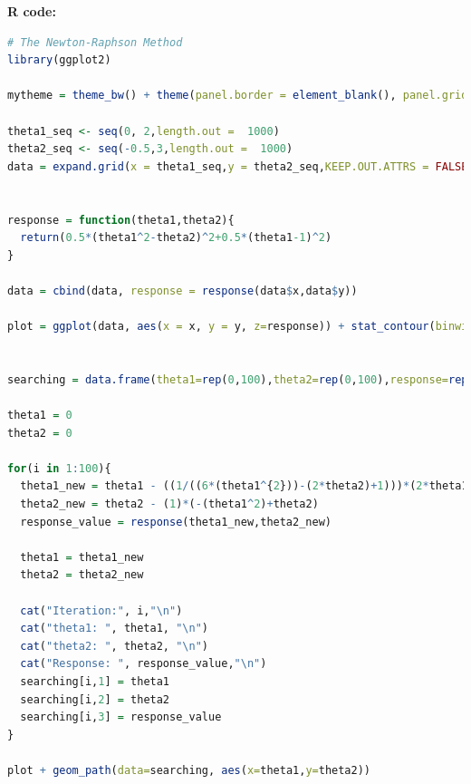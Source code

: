 \documentclass[12pt,a4paper]{article}%
\theoremstyle{definition}
\theoremstyle{plain}
\numberwithin{equation}{section}
\begin{document}
\textbf{R code:}
\tiny
\begin{lstlisting}[language=R]
# The Newton-Raphson Method
library(ggplot2)

mytheme = theme_bw() + theme(panel.border = element_blank(), panel.grid.major = element_blank())

theta1_seq <- seq(0, 2,length.out =  1000)
theta2_seq <- seq(-0.5,3,length.out =  1000)
data = expand.grid(x = theta1_seq,y = theta2_seq,KEEP.OUT.ATTRS = FALSE)


response = function(theta1,theta2){
  return(0.5*(theta1^2-theta2)^2+0.5*(theta1-1)^2)
}

data = cbind(data, response = response(data$x,data$y))

plot = ggplot(data, aes(x = x, y = y, z=response)) + stat_contour(binwidth = 0.2)+mytheme


searching = data.frame(theta1=rep(0,100),theta2=rep(0,100),response=rep(0,100))

theta1 = 0
theta2 = 0

for(i in 1:100){
  theta1_new = theta1 - ((1/((6*(theta1^{2}))-(2*theta2)+1)))*(2*theta1^{3}-2*theta1*theta2+theta1-1)
  theta2_new = theta2 - (1)*(-(theta1^2)+theta2)
  response_value = response(theta1_new,theta2_new)
  
  theta1 = theta1_new
  theta2 = theta2_new
  
  cat("Iteration:", i,"\n")
  cat("theta1: ", theta1, "\n")
  cat("theta2: ", theta2, "\n")
  cat("Response: ", response_value,"\n")
  searching[i,1] = theta1
  searching[i,2] = theta2
  searching[i,3] = response_value
}

plot + geom_path(data=searching, aes(x=theta1,y=theta2))

\end{lstlisting}
\end{document}
